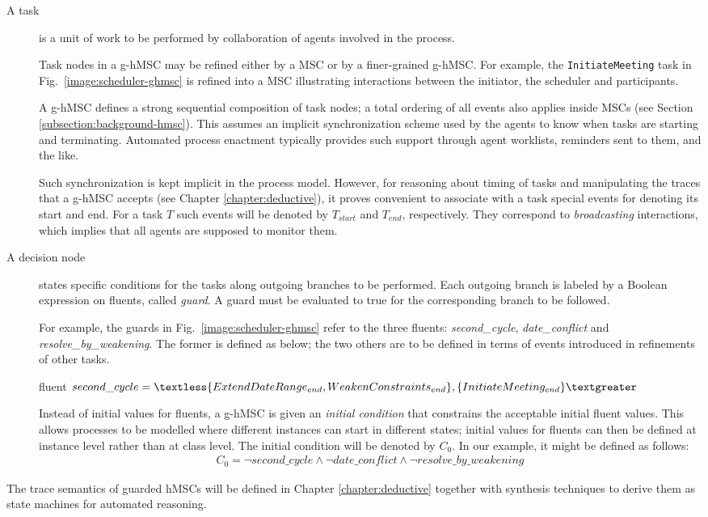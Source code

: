 \begin{description}
\item[A task] is a unit of work to be performed by collaboration of agents involved in the process. 

Task nodes in a g-hMSC may be refined either by a MSC or by a finer-grained g-hMSC. For example, the \texttt{InitiateMeeting} task in Fig.~\ref{image:scheduler-ghmsc} is refined into a MSC illustrating interactions between the initiator, the scheduler and participants. 

A g-hMSC defines a strong sequential composition of task nodes; a total ordering of all events also applies inside MSCs (see Section \ref{subsection:background-hmsc}). This assumes an implicit synchronization scheme used by the agents to know when tasks are starting and terminating. Automated process enactment typically provides such support through agent worklists, reminders sent to them, and the like. 

Such synchronization is kept implicit in the process model. However, for reasoning about timing of tasks and manipulating the traces that a g-hMSC accepts (see Chapter \ref{chapter:deductive}), it proves convenient to associate with a task special events for denoting its start and end. For a task $T$ such events will be denoted by $T_{start}$ and $T_{end}$, respectively. They correspond to \emph{broadcasting} interactions, which implies that all agents are supposed to monitor them.

\item[A decision node] states specific conditions for the tasks along outgoing branches to be performed. Each outgoing branch is labeled by a Boolean expression on fluents, called \emph{guard}. A guard must be evaluated to true for the corresponding branch to be followed.

For example, the guards in Fig.~\ref{image:scheduler-ghmsc} refer to the three fluents: \emph{second\_cycle}, \emph{date\_conflict} and \emph{resolve\_by\_weakening}. The former is defined as below; the two others are to be defined in terms of events introduced in refinements of other tasks.
\begin{center}
fluent $second\_cycle = \textless \{ ExtendDateRange_{end}, \newline WeakenConstraints_{end} \},
 \{ InitiateMeeting_{end} \} \textgreater $\\
\end{center}

Instead of initial values for fluents, a g-hMSC is given an \emph{initial condition} that constrains the acceptable initial fluent values. This allows processes to be modelled where different instances can start in different states; initial values for fluents can then be defined at instance level rather than at class level. The initial condition will be denoted by $C_0$. In our example, it might be defined as follows:
\begin{align*}
C_0 = \neg second\_cycle \wedge \neg date\_conflict \wedge \neg resolve\_by\_weakening
\end{align*}

\end{description} 

The trace semantics of guarded hMSCs will be defined in Chapter \ref{chapter:deductive} together with synthesis techniques to derive them as state machines for automated reasoning.
